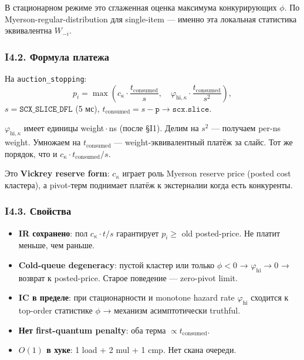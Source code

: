 \documentclass[11pt,a4paper]{article}
\begin{document}
\begin{why}
В стационарном режиме это сглаженная оценка максимума конкурирующих $\phi$.
По Myerson-regular-distribution для single-item — именно эта локальная
статистика эквивалентна $W_{-i}$.
\end{why}

\subsubsection{I4.2. Формула платежа}

На \texttt{auction\_stopping}:
\[
p_i = \max\!\left(
c_\kappa\cdot\frac{t_{\text{consumed}}}{s},\quad
\varphi_{\text{hi},\kappa}\cdot\frac{t_{\text{consumed}}}{s^2}
\right),
\]
$s=\mathtt{SCX\_SLICE\_DFL}$ (5 мс), $t_{\text{consumed}}=s-\mathtt{p{\to}scx.slice}$.

\begin{why}
$\varphi_{\text{hi},\kappa}$ имеет единицы weight\,$\cdot$\,ns (после
§I1). Делим на $s^2$ — получаем per-ns weight. Умножаем на
$t_{\text{consumed}}$ — weight-эквивалентный платёж за слайс. Тот же
порядок, что и $c_\kappa\cdot t_{\text{consumed}}/s$.
\end{why}

Это \textbf{Vickrey reserve form}: $c_\kappa$ играет роль Myerson
reserve price (posted cost кластера), а pivot-терм поднимает платёж
к экстерналии когда есть конкуренты.

\subsubsection{I4.3. Свойства}

\begin{itemize}
  \item \textbf{IR сохранено}: пол $c_\kappa\cdot t/s$ гарантирует
    $p_i\geq$ old posted-price. Не платит меньше, чем раньше.
  \item \textbf{Cold-queue degeneracy}: пустой кластер или только
    $\phi<0$ → $\varphi_{\text{hi}}\to 0$ → возврат к posted-price.
    Старое поведение — zero-pivot limit.
  \item \textbf{IC в пределе}: при стационарности и monotone hazard rate
    $\varphi_{\text{hi}}$ сходится к top-order статистике $\phi$ →
    механизм асимптотически truthful.
  \item \textbf{Нет first-quantum penalty}: оба терма $\propto t_{\text{consumed}}$.
  \item \textbf{$O(1)$ в хуке}: 1 load + 2 mul + 1 cmp. Нет скана
    очереди.
\end{itemize}
\end{document}
